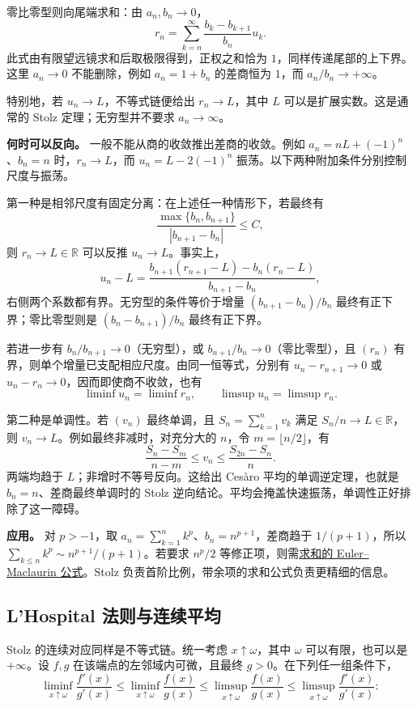 \documentclass[UTF8,12pt,a4paper,fontset=fandol]{ctexart}
\begin{document}
零比零型则向尾端求和：由 $a_n,b_n\to0$，
\[
r_n=\sum_{k=n}^{\infty}\frac{b_k-b_{k+1}}{b_n}u_k.
\]
此式由有限望远镜求和后取极限得到，正权之和恰为 $1$，同样传递尾部的上下界。这里 $a_n\to0$ 不能删除，例如 $a_n=1+b_n$ 的差商恒为 $1$，而 $a_n/b_n\to+\infty$。

特别地，若 $u_n\to L$，不等式链便给出 $r_n\to L$，其中 $L$ 可以是扩展实数。这是通常的 Stolz 定理；无穷型并不要求 $a_n\to\infty$。

\textbf{何时可以反向。} 一般不能从商的收敛推出差商的收敛。例如 $a_n=nL+(-1)^n$、$b_n=n$ 时，$r_n\to L$，而 $u_n=L-2(-1)^n$ 振荡。以下两种附加条件分别控制尺度与振荡。

第一种是相邻尺度有固定分离：在上述任一种情形下，若最终有
\[
\frac{\max\{b_n,b_{n+1}\}}{|b_{n+1}-b_n|}\leq C,
\]
则 $r_n\to L\in\mathbb R$ 可以反推 $u_n\to L$。事实上，
\[
u_n-L=
\frac{b_{n+1}(r_{n+1}-L)-b_n(r_n-L)}{b_{n+1}-b_n},
\]
右侧两个系数都有界。无穷型的条件等价于增量 $(b_{n+1}-b_n)/b_n$ 最终有正下界；零比零型则是 $(b_n-b_{n+1})/b_n$ 最终有正下界。

若进一步有 $b_n/b_{n+1}\to0$（无穷型），或 $b_{n+1}/b_n\to0$（零比零型），且 $(r_n)$ 有界，则单个增量已支配相应尺度。由同一恒等式，分别有 $u_n-r_{n+1}\to0$ 或 $u_n-r_n\to0$，因而即使商不收敛，也有
\[
\liminf u_n=\liminf r_n,\qquad
\limsup u_n=\limsup r_n.
\]

第二种是单调性。若 $(v_n)$ 最终单调，且 $S_n=\sum_{k=1}^nv_k$ 满足 $S_n/n\to L\in\mathbb R$，则 $v_n\to L$。例如最终非减时，对充分大的 $n$，令 $m=\lfloor n/2\rfloor$，有
\[
\frac{S_n-S_m}{n-m}\leq v_n
\leq\frac{S_{2n}-S_n}{n}.
\]
两端均趋于 $L$；非增时不等号反向。这给出 Cesàro 平均的单调逆定理，也就是 $b_n=n$、差商最终单调时的 Stolz 逆向结论。平均会掩盖快速振荡，单调性正好排除了这一障碍。

\textbf{应用。} 对 $p>-1$，取 $a_n=\sum_{k=1}^nk^p$、$b_n=n^{p+1}$，差商趋于 $1/(p+1)$，所以 $\sum_{k\leq n}k^p\sim n^{p+1}/(p+1)$。若要求 $n^p/2$ 等修正项，则需\hyperref[app:taylor-em]{求和的 Euler--Maclaurin 公式}。Stolz 负责首阶比例，带余项的求和公式负责更精细的信息。

\subsection{L’Hospital 法则与连续平均}

\label{app:limit-lhospital}

Stolz 的连续对应同样是不等式链。统一考虑 $x\uparrow\omega$，其中 $\omega$ 可以有限，也可以是 $+\infty$。设 $f,g$ 在该端点的左邻域内可微，且最终 $g>0$。在下列任一组条件下，
\[
\liminf_{x\uparrow\omega}\frac{f'(x)}{g'(x)}
\leq\liminf_{x\uparrow\omega}\frac{f(x)}{g(x)}
\leq\limsup_{x\uparrow\omega}\frac{f(x)}{g(x)}
\leq\limsup_{x\uparrow\omega}\frac{f'(x)}{g'(x)}:
\]
\end{document}
